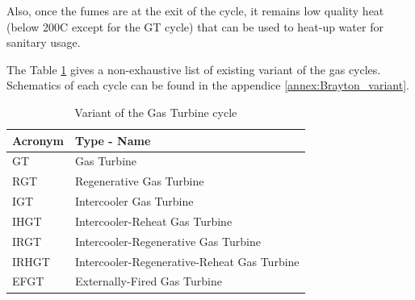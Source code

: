 Also, once the fumes are at the exit of the cycle, it remains low quality heat (below 200\degree C except for the GT cycle) that can be used to heat-up water for sanitary usage.

The Table \ref{tab:C5_inputconfig} gives a non-exhaustive list of existing variant of the gas cycles. Schematics of each cycle can be found in the appendice \ref{annex:Brayton_variant}.
\begin{longtable}[c]{ll}
\caption{Variant of the Gas Turbine cycle}
\label{tab:C5_inputconfig}\\
\toprule
\textbf{Acronym} & \textbf{Type - Name}                   \\* \midrule
\endfirsthead
%
\endhead
%
\bottomrule
\endfoot
%
\endlastfoot
%
GT                           & Gas Turbine                                 \\
RGT                          & Regenerative Gas Turbine                    \\
IGT                          & Intercooler Gas Turbine                     \\
IHGT                         & Intercooler-Reheat Gas Turbine              \\
IRGT                         & Intercooler-Regenerative Gas Turbine        \\
IRHGT                        & Intercooler-Regenerative-Reheat Gas Turbine \\
EFGT                         & Externally-Fired Gas Turbine                \\* \bottomrule
\end{longtable}
